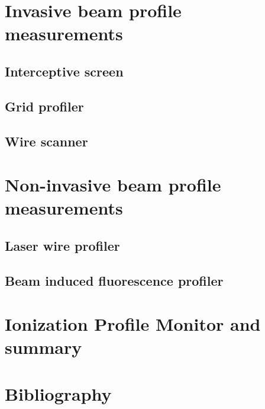 \begin{refsection}
  \section{Invasive beam profile measurements}
  \subsection{Interceptive screen}
  \subsection{Grid profiler}
  \subsection{Wire scanner}
  \section{Non-invasive beam profile measurements}
  \subsection{Laser wire profiler}
  \subsection{Beam induced fluorescence profiler}
  \section{Ionization Profile Monitor and summary}
  \label{ch2:Summary}

  \cleardoublepage
  \section*{Bibliography}
  \label{ch2:bib}
  \printbibliography[heading=subbibliography]

\end{refsection}